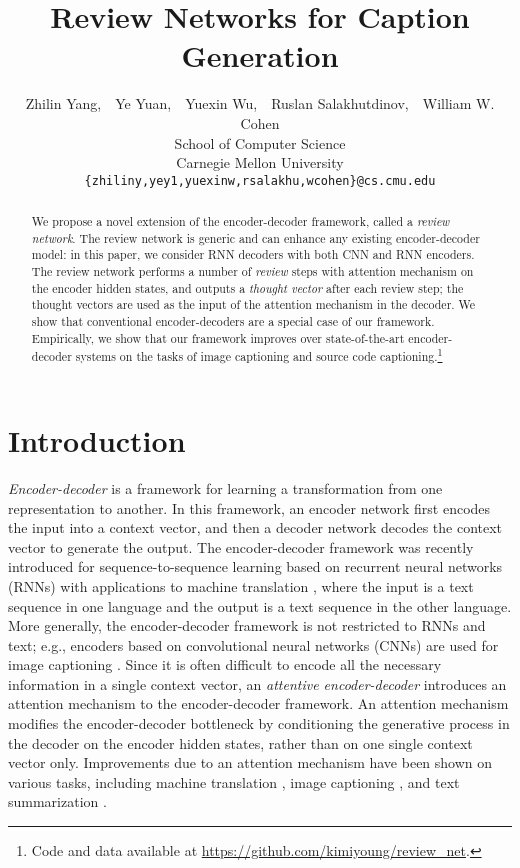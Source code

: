 \documentclass{article}
\title{Review Networks for Caption Generation}
\author{
  Zhilin Yang,~~Ye Yuan,~~Yuexin Wu,~~Ruslan Salakhutdinov,~~William W. Cohen \\
  School of Computer Science \\
  Carnegie Mellon University \\
  \texttt{\{zhiliny,yey1,yuexinw,rsalakhu,wcohen\}@cs.cmu.edu}
}
\begin{document}
\maketitle

\begin{abstract}

We propose a novel extension of the encoder-decoder framework, called a \textit{review network}.
The review network is generic and can enhance any existing encoder-decoder model: in this paper, we consider RNN decoders with both CNN and RNN encoders. The review network performs a number of \textit{review} steps with attention mechanism on the encoder hidden states, and outputs a \textit{thought vector} after each review step; the thought vectors are used as the input of the attention mechanism in the decoder. We show that conventional encoder-decoders are a special case of our framework. Empirically, we show that our framework improves over state-of-the-art encoder-decoder systems on the tasks of image captioning and source code captioning.\footnote{Code and data available at \url{https://github.com/kimiyoung/review_net}.}

\end{abstract}

\section{Introduction}\textit{Encoder-decoder} is a framework for learning a transformation from one representation to another. In this framework, an encoder network first encodes the input into a context vector, and then a decoder network decodes the context vector to generate the output. The encoder-decoder framework was recently introduced for sequence-to-sequence learning based on recurrent neural networks (RNNs) with applications to machine translation \cite{cho2014learning,sutskever2014sequence}, where the input is a text sequence in one language and the output is a text sequence in the other language. More generally, the encoder-decoder framework is not restricted to RNNs and text; e.g., encoders based on convolutional neural networks (CNNs) are used for image captioning \cite{vinyals2015show}.
Since it is often difficult to encode all the necessary information in a single context vector, an \textit{attentive encoder-decoder} introduces an attention mechanism to the encoder-decoder framework. An attention mechanism modifies the encoder-decoder bottleneck by conditioning the generative process in the decoder on the encoder hidden states, rather than on one single context vector only.
Improvements due to an attention mechanism have been shown on various tasks, including machine translation \cite{bahdanau2014neural}, image captioning \cite{xu2015show}, and text summarization \cite{rush2015neural}.
\end{document}
